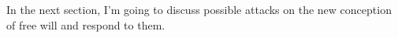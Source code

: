 
In the next section, I'm going to discuss possible attacks on the new conception of free will and respond to them.

